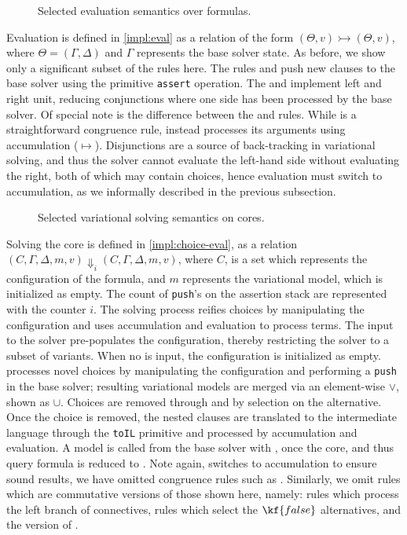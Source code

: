%
\begin{figure}
  
  \caption{Selected evaluation semantics over \vpl{} formulas.}%
  \label{impl:eval}
\end{figure}

Evaluation is defined in \autoref{impl:eval} as a relation of the form
$(\Theta,v)\rightarrowtail(\Theta,v)$, where $\Theta=(\Gamma,\Delta)$ and
$\Gamma$ represents the base solver state.
%
As before, we show only a significant subset of the rules here. The rules
 and  push new clauses to the base solver using the
primitive \texttt{assert} operation. The  and  implement
left and right unit, reducing conjunctions where one side has been processed by
the base solver.
%
Of special note is the difference between the  and  rules.
While  is a straightforward congruence rule,  instead
processes its arguments using accumulation ($\mapsto$). Disjunctions are a
source of back-tracking in variational solving, and thus the solver cannot
evaluate the left-hand side without evaluating the right, both of which may
contain choices, hence evaluation must switch to accumulation, as we informally
described in the previous subsection.

\begin{figure}
  
  \caption{Selected variational solving semantics on cores.}%
  \label{impl:choice-eval}
\end{figure}

Solving the core is defined in \autoref{impl:choice-eval}, as a relation
%
$(C, \Gamma, \Delta, m,v) \Downarrow_{i} (C, \Gamma, \Delta, m, v)$, where $C$,
is a set which represents the configuration of the \vpl{} formula, and $m$
represents the variational model, which is initialized as empty.
%
The count of \texttt{push}'s on the assertion stack are represented with the
counter $i$. The solving process reifies choices by manipulating the
configuration and uses accumulation and evaluation to process terms. The \vc{}
input to the solver pre-populates the configuration, thereby restricting the
solver to a subset of variants. When no \vc{} is input, the configuration is
initialized as empty.  processes novel choices by manipulating the
configuration and performing a \texttt{push} in the base solver; resulting
variational models are merged via an element-wise $\vee$, shown as $\cup$.
Choices are removed through  and  by selection on the
alternative. Once the choice is removed, the nested clauses are translated to
the intermediate language through the \texttt{toIL} primitive and processed by
accumulation and evaluation. A model is called from the base solver with
, once the core, and thus query formula is reduced to \unit{}. Note
again,  switches to accumulation to ensure sound results, we have
omitted congruence rules such as . Similarly, we omit rules which are
commutative versions of those shown here, namely: rules which process the left
branch of connectives, rules which select the $\kf{false}$ alternatives,
and the  version of .

